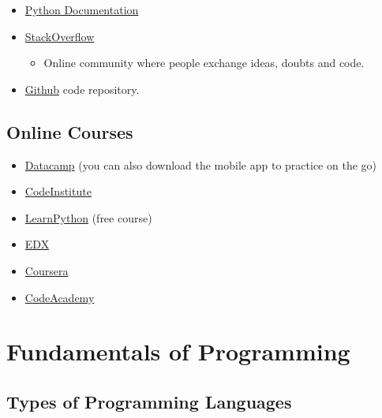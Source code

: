 \documentclass[11pt]{article}
\providecommand{\tightlist}{%
      \setlength{\itemsep}{0pt}\setlength{\parskip}{0pt}}
\begin{document}
\begin{itemize}
\tightlist
\item
  \href{https://docs.python.org/3/}{Python Documentation}
\item
  \href{https://stackoverflow.com/questions/tagged/python}{StackOverflow}

  \begin{itemize}
  \tightlist
  \item
    Online community where people exchange ideas, doubts and code.
  \end{itemize}
\item
  \href{https://github.com/python}{Github} code repository.
\end{itemize}

    \subsection{Online Courses}\label{online-courses}

\begin{itemize}
\tightlist
\item
  \href{https://www.datacamp.com/courses/intro-to-python-for-data-science?utm_source=adwords_ppc\&utm_campaignid=805200711\&utm_adgroupid=43370829484\&utm_device=c\&utm_keyword=\%2Bdatacamp\%20\%2Bpython\&utm_matchtype=b\&utm_network=g\&utm_adpostion=1t1\&utm_creative=191104999116\&utm_targetid=kwd-414126611260\&utm_loc_interest_ms=\&utm_loc_physical_ms=9046834\&gclid=CjwKCAjw7_rlBRBaEiwAc23rhjfi2Mw2qxQ1_zJmVEph39YX5t6HkFUTmp48oqIpZ51eN2SYDpBPahoCqGEQAvD_BwE}{Datacamp}
  (you can also download the mobile app to practice on the go)
\item
  \href{www.codeinstitute.net}{CodeInstitute}
\item
  \href{https://www.learnpython.org/}{LearnPython} (free course)
\item
  \href{https://www.edx.org/learn/python}{EDX}
\item
  \href{https://www.coursera.org/courses?query=python}{Coursera}
\item
  \href{https://www.codecademy.com/learn/learn-python}{CodeAcademy}
\end{itemize}

    \section{Fundamentals of Programming}\label{fundamentals-of-programming}

    \subsection{Types of Programming
Languages}\label{types-of-programming-languages}
\end{document}
